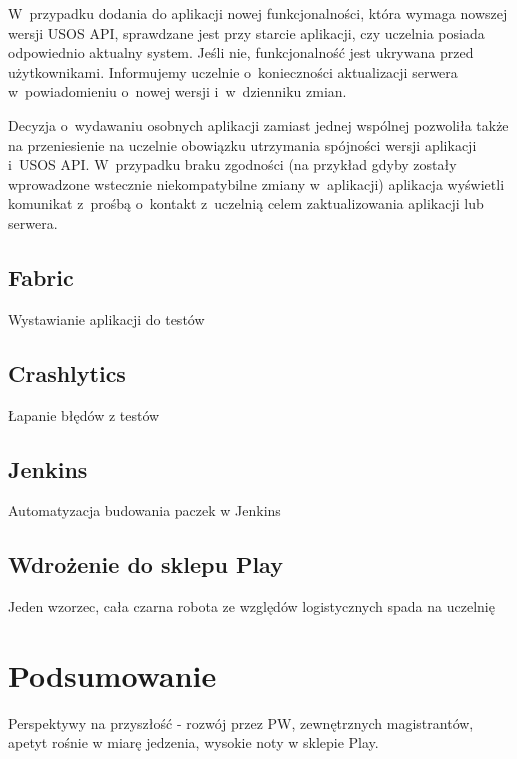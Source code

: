 \documentclass{pracamgr}
\let\cleardoublepage\clearpage
\begin{document}
W~przypadku dodania do aplikacji nowej funkcjonalności, która wymaga nowszej wersji USOS API, sprawdzane jest przy starcie
aplikacji, czy uczelnia posiada odpowiednio aktualny system. Jeśli nie, funkcjonalność jest ukrywana przed użytkownikami.
Informujemy uczelnie o~konieczności aktualizacji serwera w~powiadomieniu o~nowej wersji i~w~dzienniku zmian.

Decyzja o~wydawaniu osobnych aplikacji zamiast jednej wspólnej pozwoliła także na przeniesienie na uczelnie obowiązku
utrzymania spójności wersji aplikacji i~USOS API. W~przypadku braku zgodności (na przykład gdyby zostały wprowadzone
wstecznie niekompatybilne zmiany w~aplikacji) aplikacja wyświetli komunikat z~prośbą o~kontakt z~uczelnią celem zaktualizowania
aplikacji lub serwera.

\section{Fabric}

Wystawianie aplikacji do testów

\section{Crashlytics}

Łapanie błędów z testów

\section{Jenkins}

Automatyzacja budowania paczek w Jenkins

\section{Wdrożenie do sklepu Play}

Jeden wzorzec, cała czarna robota ze względów logistycznych spada na uczelnię

\chapter{Podsumowanie}

Perspektywy na przyszłość - rozwój przez PW, zewnętrznych magistrantów, apetyt rośnie w miarę jedzenia, wysokie noty w sklepie Play.

\appendix

\cleardoublepage
{}
{}
\listoffigures
\end{document}
